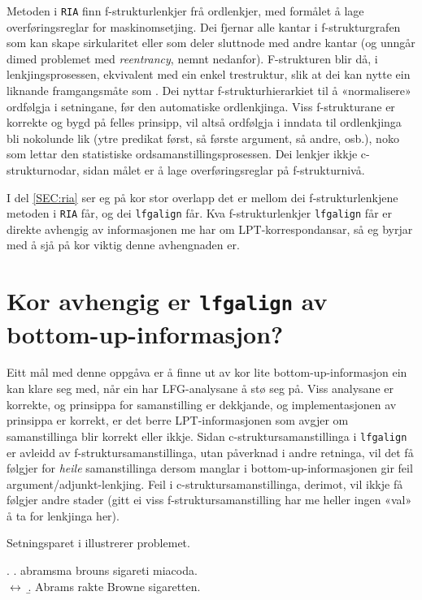 \documentclass[12pt,a4paper,oneside,draft]{report}
\begin{document}
 Metoden i \texttt{RIA} \citep{graham2009osr,graham2009fts} finn
 f-strukturlenkjer frå ordlenkjer, med formålet å lage
 overføringsreglar for maskinomsetjing. Dei fjernar alle kantar i
 f-strukturgrafen som kan skape sirkularitet eller som deler sluttnode
 med andre kantar (og unngår dimed problemet med \emph{reentrancy}, nemnt
 nedanfor). F-strukturen blir då, i lenkjingsprosessen, ekvivalent med
 ein enkel trestruktur, slik at dei kan nytte ein liknande
 framgangsmåte som \citet{samuelsson2007apa}.  Dei nyttar
 f-strukturhierarkiet til å «normalisere» ordfølgja i setningane, før
 den automatiske ordlenkjinga. Viss f-strukturane er korrekte og bygd
 på felles prinsipp, vil altså ordfølgja i inndata til ordlenkjinga
 bli nokolunde lik (ytre predikat først, så første argument, så andre,
 osb.), noko som lettar den statistiske ordsamanstillingsprosessen.
 Dei lenkjer ikkje c-strukturnodar, sidan målet er å lage
 overføringsreglar på f-strukturnivå.

 I del \ref{SEC:ria} ser eg på kor stor overlapp det er mellom dei
 f-strukturlenkjene metoden i \texttt{RIA} får, og dei \texttt{lfgalign} får. Kva
 f-strukturlenkjer \texttt{lfgalign} får er direkte avhengig av informasjonen
 me har om LPT-korrespondansar, så eg byrjar med å sjå på kor viktig
 denne avhengnaden er.

 
\section{Kor avhengig er \texttt{lfgalign} av bottom-up-informasjon?}
\label{sec-5.3}

 Eitt mål med denne oppgåva er å finne ut av kor lite
 bottom-up-informasjon ein kan klare seg med, når ein har
 LFG-analysane å stø seg på. Viss analysane er korrekte, og prinsippa
 for samanstilling er dekkjande, og implementasjonen av prinsippa er
 korrekt, er det berre LPT-informasjonen som avgjer om samanstillinga
 blir korrekt eller ikkje. Sidan c-struktursamanstillinga i \texttt{lfgalign}
 er avleidd av f-struktursamanstillinga, utan påverknad i andre
 retninga, vil det få følgjer for \emph{heile} samanstillinga dersom
 manglar i bottom-up-informasjonen gir feil
 argument/adjunkt-lenkjing. Feil i c-struktursamanstillinga, derimot,
 vil ikkje få følgjer andre stader (gitt ei viss
 f-struktursamanstilling har me heller ingen «val» å ta for lenkjinga
 her).

 Setningsparet i \Next illustrerer problemet.

\ex. \a. abramsma brouns sigareti miacoda.\\
     $\leftrightarrow$
     \b. Abrams rakte Browne sigaretten.
     
\end{document}
